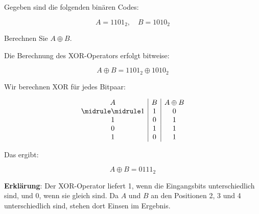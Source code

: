 \begin{myexercise}
	Gegeben sind die folgenden binären Codes:

	\[
		A = 1101_2, \quad B = 1010_2
	\]

	Berechnen Sie \( A \oplus B \).

	\begin{myanswer}
		Die Berechnung des XOR-Operators erfolgt bitweise:

		\[
			A \oplus B = 1101_2 \oplus 1010_2
		\]

		Wir berechnen XOR für jedes Bitpaar:

		\[
			\begin{array}{c|c|c}
				A & B & A \oplus B \\\midrule\midrule
				1 & 1 & 0          \\
				1 & 0 & 1          \\
				0 & 1 & 1          \\
				1 & 0 & 1          \\
			\end{array}
		\]

		Das ergibt:

		\[
			A \oplus B = 0111_2
		\]

		\textbf{Erklärung}:
		Der XOR-Operator liefert 1, wenn die Eingangsbits unterschiedlich sind, und 0, wenn sie gleich sind. Da \( A \) und \( B \) an den Positionen 2, 3 und 4 unterschiedlich sind, stehen dort Einsen im Ergebnis.

	\end{myanswer}
\end{myexercise}


